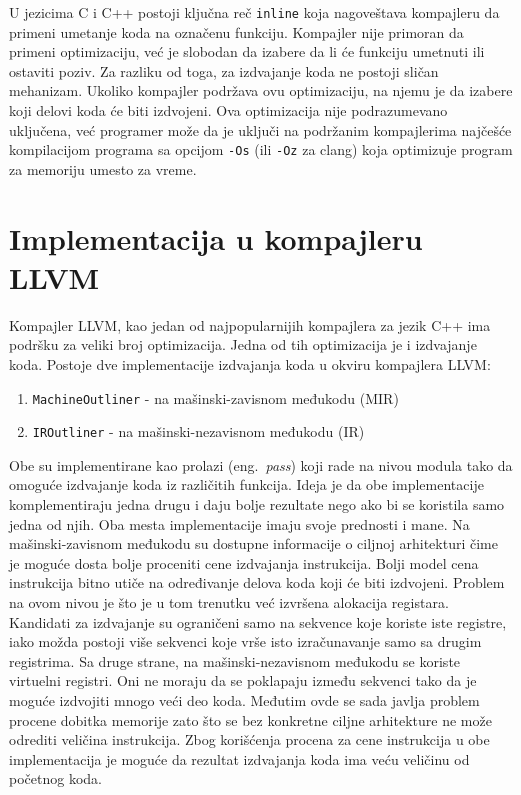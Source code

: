 \documentclass[12pt,oneside]{memoir}
\begin{document}
U jezicima C i C++ postoji ključna reč \verb|inline| koja nagoveštava kompajleru da primeni umetanje koda na označenu funkciju. %
Kompajler nije primoran da primeni optimizaciju, već je slobodan da izabere da li će funkciju umetnuti ili ostaviti poziv.
Za razliku od toga, za izdvajanje koda ne postoji sličan mehanizam.
Ukoliko kompajler podržava ovu optimizaciju, na njemu je da izabere koji delovi koda će biti izdvojeni.
Ova optimizacija nije podrazumevano uključena, već programer može da je uključi na podržanim kompajlerima najčešće kompilacijom programa sa opcijom \verb|-Os| (ili \verb|-Oz| za clang) koja optimizuje program za memoriju umesto za vreme.

\section{Implementacija u kompajleru LLVM}

Kompajler LLVM, kao jedan od najpopularnijih kompajlera za jezik C++ ima podršku za veliki broj optimizacija.
Jedna od tih optimizacija je i izdvajanje koda.
Postoje dve implementacije izdvajanja koda u okviru kompajlera LLVM:
\begin{enumerate}
  \item \verb|MachineOutliner| - na mašinski-zavisnom međukodu (MIR) \cite{paquette2016machineoutliner} %
  \item \verb|IROutliner| - na mašinski-nezavisnom međukodu (IR) \cite{litteken2020iroutliner} %
\end{enumerate}
Obe su implementirane kao prolazi (eng.~{\em pass}) koji rade na nivou modula tako da omoguće izdvajanje koda iz različitih funkcija.
Ideja je da obe implementacije komplementiraju jedna drugu i daju bolje rezultate nego ako bi se koristila samo jedna od njih.
Oba mesta implementacije imaju svoje prednosti i mane.
Na mašinski-zavisnom međukodu su dostupne informacije o ciljnoj arhitekturi čime je moguće dosta bolje proceniti cene izdvajanja instrukcija.
Bolji model cena instrukcija bitno utiče na određivanje delova koda koji će biti izdvojeni.
Problem na ovom nivou je što je u tom trenutku već izvršena alokacija registara.
Kandidati za izdvajanje su ograničeni samo na sekvence koje koriste iste registre, iako možda postoji više sekvenci koje vrše isto izračunavanje samo sa drugim registrima.
Sa druge strane, na mašinski-nezavisnom međukodu se koriste virtuelni registri.
Oni ne moraju da se poklapaju između sekvenci tako da je moguće izdvojiti mnogo veći deo koda.
Međutim ovde se sada javlja problem procene dobitka memorije zato što se bez konkretne ciljne arhitekture ne može odrediti veličina instrukcija.
Zbog korišćenja procena za cene instrukcija u obe implementacija je moguće da rezultat izdvajanja koda ima veću veličinu od početnog koda.
\end{document}
